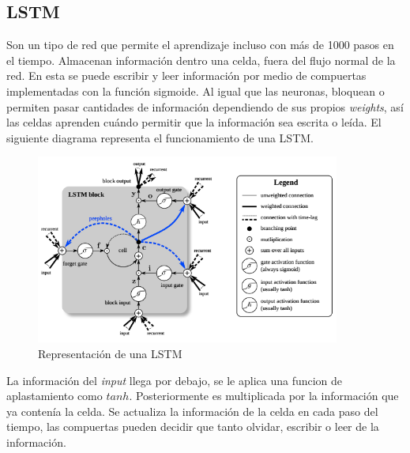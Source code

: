 \documentclass[12pt,spanish]{article}
\begin{document}
	\subsection{LSTM}
	Son un tipo de red que permite el aprendizaje incluso con más de 1000 pasos en el tiempo. Almacenan información dentro una celda, fuera del flujo normal de la red. En esta se puede escribir y leer información por medio de compuertas implementadas con la función sigmoide. Al igual que las neuronas, bloquean o permiten pasar cantidades de información dependiendo de sus propios \textit{weights}, así las celdas aprenden cuándo permitir que la información sea escrita o leída. El siguiente diagrama representa el funcionamiento de una LSTM.\\
	\begin{figure}[H]
		\centering
		\includegraphics[width=10cm]{Imagenes/lstm_structure.png}
		\begin{centering}
			\caption{Representación de una LSTM}
		\end{centering}
	\end{figure}
	La información del \textit{input} llega por debajo, se le aplica una funcion de aplastamiento como $tanh$. Posteriormente es multiplicada por la información que ya contenía la celda. Se actualiza la información de la celda en cada paso del tiempo, las compuertas pueden decidir que tanto olvidar, escribir o leer de la información.
\end{document}
